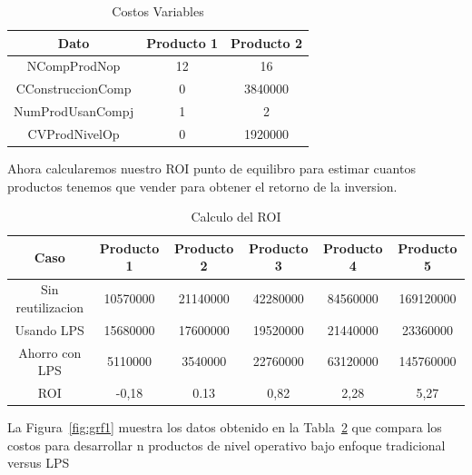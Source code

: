 \documentclass[10pt,a4paper,openany]{book}
\begin{document}
\begin{table}[htbp]
\centering
\begin{tabular}{|c|c|c|} \hline
 Dato & Producto 1  & Producto 2 \\[0.5ex] \hline
 NCompProdNop      &  12 & 16  \\[0.5ex] \hline
 CConstruccionComp &  0  & 3840000  \\[0.5ex] \hline
 NumProdUsanCompj  &  1  & 2 \\[0.5ex] \hline
 CVProdNivelOp     &  0  &  1920000 \\[0.5ex] \hline
\end{tabular}
\caption{Costos Variables}
\label{table:t2}
\end{table}

Ahora calcularemos nuestro ROI punto de equilibro para estimar cuantos productos tenemos que vender para obtener el retorno de la inversion.

\begin{table}[htbp]
\centering
\begin{tabular}{|c|c|c|c|c|c|} \hline
 Caso & Producto 1  & Producto 2 & Producto 3 & Producto 4 & Producto 5\\[0.5ex] \hline
 Sin reutilizacion  & 10570000 & 21140000 & 42280000  & 84560000  & 169120000 \\[0.5ex] \hline
 Usando LPS         & 15680000 & 17600000 & 19520000  & 21440000  & 23360000 \\[0.5ex] \hline
 Ahorro con LPS     & 5110000  & 3540000  & 22760000  & 63120000  & 145760000 \\[0.5ex] \hline
 ROI                & -0,18    & 0.13     &  0,82     & 2,28      & 5,27 \\[0.5ex] \hline
 
\end{tabular}
\caption{Calculo del ROI}
\label{table:t3}
\end{table}


La Figura~\ref{fig:grf1} muestra los datos obtenido en la Tabla~\ref{table:t3} que compara los costos para desarrollar n productos de nivel operativo bajo enfoque tradicional versus LPS

\vspace{18cm}
\end{document}

